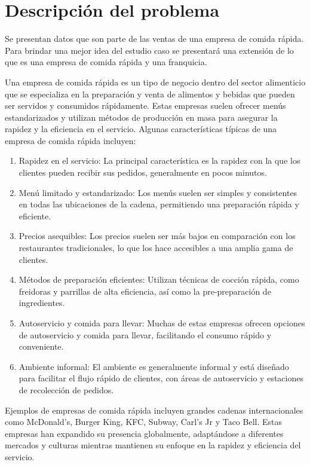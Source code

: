 \documentclass[
  us-letterpaper,
]{scrreprt}
\theoremstyle{plain}
\theoremstyle{plain}
\theoremstyle{definition}
\theoremstyle{remark}
\begin{document}
\section{Descripción del problema}\label{descripciuxf3n-del-problema}

Se presentan datos que son parte de las ventas de una empresa de comida
rápida. Para brindar una mejor idea del estudio caso se presentará una
extensión de lo que es una empresa de comida rápida y una franquicia.

Una empresa de comida rápida es un tipo de negocio dentro del sector
alimenticio que se especializa en la preparación y venta de alimentos y
bebidas que pueden ser servidos y consumidos rápidamente. Estas empresas
suelen ofrecer menús estandarizados y utilizan métodos de producción en
masa para asegurar la rapidez y la eficiencia en el servicio. Algunas
características típicas de una empresa de comida rápida incluyen:

\begin{enumerate}
\def\labelenumi{\arabic{enumi}.}
\item
  Rapidez en el servicio: La principal característica es la rapidez con
  la que los clientes pueden recibir sus pedidos, generalmente en pocos
  minutos.
\item
  Menú limitado y estandarizado: Los menús suelen ser simples y
  consistentes en todas las ubicaciones de la cadena, permitiendo una
  preparación rápida y eficiente.
\item
  Precios asequibles: Los precios suelen ser más bajos en comparación
  con los restaurantes tradicionales, lo que los hace accesibles a una
  amplia gama de clientes.
\item
  Métodos de preparación eficientes: Utilizan técnicas de cocción
  rápida, como freidoras y parrillas de alta eficiencia, así como la
  pre-preparación de ingredientes.
\item
  Autoservicio y comida para llevar: Muchas de estas empresas ofrecen
  opciones de autoservicio y comida para llevar, facilitando el consumo
  rápido y conveniente.
\item
  Ambiente informal: El ambiente es generalmente informal y está
  diseñado para facilitar el flujo rápido de clientes, con áreas de
  autoservicio y estaciones de recolección de pedidos.
\end{enumerate}

Ejemplos de empresas de comida rápida incluyen grandes cadenas
internacionales como McDonald's, Burger King, KFC, Subway, Carl's Jr y
Taco Bell. Estas empresas han expandido su presencia globalmente,
adaptándose a diferentes mercados y culturas mientras mantienen su
enfoque en la rapidez y eficiencia del servicio.
\end{document}
